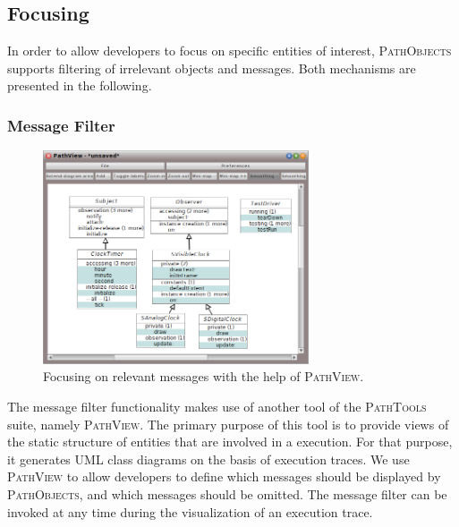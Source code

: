 \subsection{Focusing}
\label{ss:ImplementationFocusing}
In order to allow developers to focus on specific entities of interest, \textsc{PathObjects} supports filtering of irrelevant objects and messages.
Both mechanisms are presented in the following.

\subsubsection{Message Filter}

\begin{figure}[tb]
	\centering
	\includegraphics[width=0.7\textwidth]{../images/04-ImplMessageFilter}
	\caption{Focusing on relevant messages with the help of \textsc{PathView}.}
	\label{fig:ImplementationFocusingMessages}
\end{figure}

The message filter functionality makes use of another tool of the \textsc{PathTools} suite, namely \textsc{PathView}.
The primary purpose of this tool is to provide views of the static structure of entities that are involved in a execution.
For that purpose, it generates UML class diagrams on the basis of execution traces.
We use \textsc{PathView} to allow developers to define which messages should be displayed by \textsc{PathObjects}, and which messages should be omitted.
The message filter can be invoked at any time during the visualization of an execution trace.

